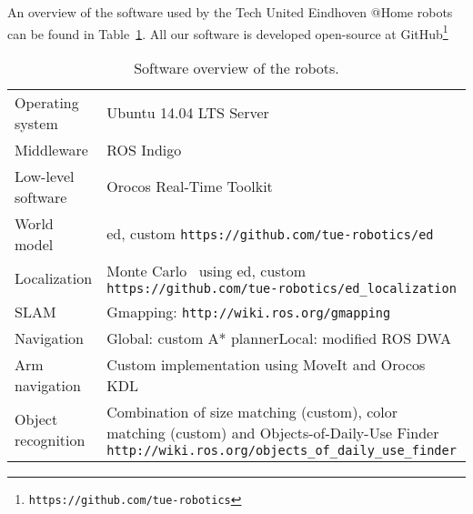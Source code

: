 An overview of the software used by the Tech United Eindhoven @Home robots can be found in Table~\ref{tab:softwarespec}.
All our software is developed open-source at GitHub\footnote{\texttt{https://github.com/tue-robotics}}

\begin{table}[H]
    \begin{center}
    \caption{Software overview of the robots.}
    \label{tab:softwarespec}
    \vspace{-0.25cm}
    \renewcommand{\arraystretch}{1.0}
    \setlength{\tabcolsep}{5pt}
        \begin{tabular}{p{} p{}}
        	\toprule
            Operating system & Ubuntu 14.04 LTS Server\\
            
            Middleware & ROS Indigo~\cite{Quigley2009}\\
            
            Low-level software & Orocos Real-Time Toolkit~\cite{Bruyninckx2001}\\
            
            World model & \acrfull{ed}, custom \newline \texttt{https://github.com/tue-robotics/ed}\\
            
            Localization & Monte Carlo~\cite{Fox2003} using \gls{ed}, custom \newline \texttt{https://github.com/tue-robotics/ed\_localization}\\
            
            SLAM & Gmapping: \texttt{http://wiki.ros.org/gmapping}\\
            
            Navigation & Global: custom A* planner\newline Local: modified ROS DWA~\cite{Fox1997}\\
            
            Arm navigation & Custom implementation using MoveIt and Orocos KDL\\
            
            Object recognition & Combination of size matching (custom), color matching (custom) and Objects-of-Daily-Use Finder \newline \texttt{http://wiki.ros.org/objects\_of\_daily\_use\_finder} \\
            

\end{tabular}
\end{center}
\end{table}
